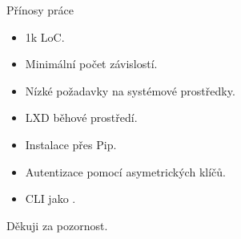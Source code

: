 \documentclass{beamer}
\begin{document}
\begin{frame}{Přínosy práce}
\begin{itemize}
	\item 1k LoC.
	\item Minimální počet závislostí.
	\item Nízké požadavky na systémové prostředky.
	\item LXD běhové prostředí.
	\item Instalace přes Pip.
	\item Autentizace pomocí asymetrických klíčů.
	\item CLI jako .
\end{itemize}
\end{frame}

\begin{frame}[standout]
	Děkuji za pozornost.
\end{frame}
\end{document}
